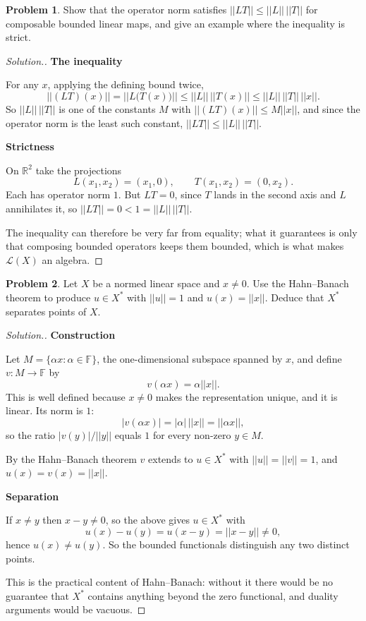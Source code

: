 \documentclass[11pt,a4paper]{article}
\theoremstyle{definition}
\newtheorem{problemx}{Problem}[section]
\newenvironment{problem}{\begin{problemx}}{\end{problemx}}
\newenvironment{solution}
  {\renewcommand{\qedsymbol}{}\begin{proof}[\textit{Solution}.]}
  {\end{proof}}
\newcommand{\subhead}[1]{%
  \par\medskip\noindent\textbf{#1}\par\nobreak\smallskip}
\begin{document}
\begin{problem}
Show that the operator norm satisfies $||LT||\leq ||L||\,||T||$ for composable
bounded linear maps, and give an example where the inequality is strict.
\end{problem}
\begin{solution}
\subhead{The inequality}
For any $x$, applying the defining bound twice,
$$||(LT)(x)||=||L\big(T(x)\big)||\leq ||L||\,||T(x)||\leq ||L||\,||T||\,||x|| .$$
So $||L||\,||T||$ is one of the constants $M$ with $||(LT)(x)||\leq M||x||$,
and since the operator norm is the least such constant,
$||LT||\leq ||L||\,||T||$.

\subhead{Strictness}
On $\mathbb{R}^2$ take the projections
$$L(x_1,x_2)=(x_1,0),\qquad T(x_1,x_2)=(0,x_2).$$
Each has operator norm $1$. But $LT=0$, since $T$ lands in the second axis and
$L$ annihilates it, so $||LT||=0<1=||L||\,||T||$.

The inequality can therefore be very far from equality; what it guarantees is
only that composing bounded operators keeps them bounded, which is what makes
$\mathcal{L}(X)$ an algebra.
\end{solution}

\begin{problem}
Let $X$ be a normed linear space and $x\neq 0$. Use the Hahn--Banach theorem to
produce $u\in X^*$ with $||u||=1$ and $u(x)=||x||$. Deduce that $X^*$
separates points of $X$.
\end{problem}
\begin{solution}
\subhead{Construction}
Let $M=\{\alpha x:\alpha\in\mathbb{F}\}$, the one-dimensional subspace spanned
by $x$, and define $v:M\rightarrow\mathbb{F}$ by
$$v(\alpha x)=\alpha||x|| .$$
This is well defined because $x\neq 0$ makes the representation unique, and it
is linear. Its norm is $1$:
$$|v(\alpha x)|=|\alpha|\,||x||=||\alpha x|| ,$$
so the ratio $|v(y)|/||y||$ equals $1$ for every non-zero $y\in M$.

By the Hahn--Banach theorem $v$ extends to $u\in X^*$ with $||u||=||v||=1$, and
$u(x)=v(x)=||x||$.

\subhead{Separation}
If $x\neq y$ then $x-y\neq 0$, so the above gives $u\in X^*$ with
$$u(x)-u(y)=u(x-y)=||x-y||\neq 0 ,$$
hence $u(x)\neq u(y)$. So the bounded functionals distinguish any two distinct
points.

This is the practical content of Hahn--Banach: without it there would be no
guarantee that $X^*$ contains anything beyond the zero functional, and duality
arguments would be vacuous.
\end{solution}
\end{document}
